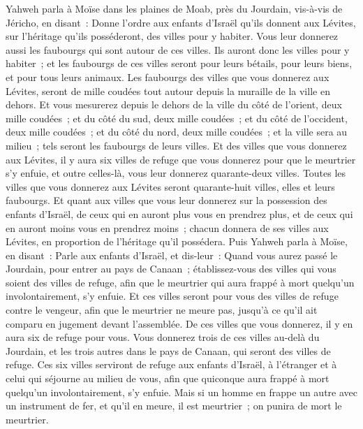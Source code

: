\begin{multicols}{2}
\VerseOne{}Yahweh parla à Moïse dans les plaines de Moab, près du Jourdain, vis-à-vis de Jéricho, en disant~:
Donne l'ordre aux enfants d'Israël qu'ils donnent aux Lévites, sur l'héritage qu'ils posséderont, des villes pour y habiter. Vous leur donnerez aussi les faubourgs qui sont autour de ces villes.
Ils auront donc les villes pour y habiter~; et les faubourgs de ces villes seront pour leurs bétails, pour leurs biens, et pour tous leurs animaux.
Les faubourgs des villes que vous donnerez aux Lévites, seront de mille coudées tout autour depuis la muraille de la ville en dehors.
Et vous mesurerez depuis le dehors de la ville du côté de l'orient, deux mille coudées~; et du côté du sud, deux mille coudées~; et du côté de l'occident, deux mille coudées~; et du côté du nord, deux mille coudées~; et la ville sera au milieu~; tels seront les faubourgs de leurs villes.
Et des villes que vous donnerez aux Lévites, il y aura six villes de refuge que vous donnerez pour que le meurtrier s'y enfuie, et outre celles-là, vous leur donnerez quarante-deux villes.
Toutes les villes que vous donnerez aux Lévites seront quarante-huit villes, elles et leurs faubourgs.
Et quant aux villes que vous leur donnerez sur la possession des enfants d'Israël, de ceux qui en auront plus vous en prendrez plus, et de ceux qui en auront moins vous en prendrez moins~; chacun donnera de ses villes aux Lévites, en proportion de l'héritage qu'il possédera.
Puis Yahweh parla à Moïse, en disant~:
Parle aux enfants d'Israël, et dis-leur~: Quand vous aurez passé le Jourdain, pour entrer au pays de Canaan~;
établissez-vous des villes qui vous soient des villes de refuge, afin que le meurtrier qui aura frappé à mort quelqu'un involontairement, s'y enfuie.
Et ces villes seront pour vous des villes de refuge contre le vengeur, afin que le meurtrier ne meure pas, jusqu'à ce qu'il ait comparu en jugement devant l'assemblée.
De ces villes que vous donnerez, il y en aura six de refuge pour vous.
Vous donnerez trois de ces villes au-delà du Jourdain, et les trois autres dans le pays de Canaan, qui seront des villes de refuge.
Ces six villes serviront de refuge aux enfants d'Israël, à l'étranger et à celui qui séjourne au milieu de vous, afin que quiconque aura frappé à mort quelqu'un involontairement, s'y enfuie.
Mais si un homme en frappe un autre avec un instrument de fer, et qu'il en meure, il est meurtrier~; on punira de mort le meurtrier.

\end{multicols}
